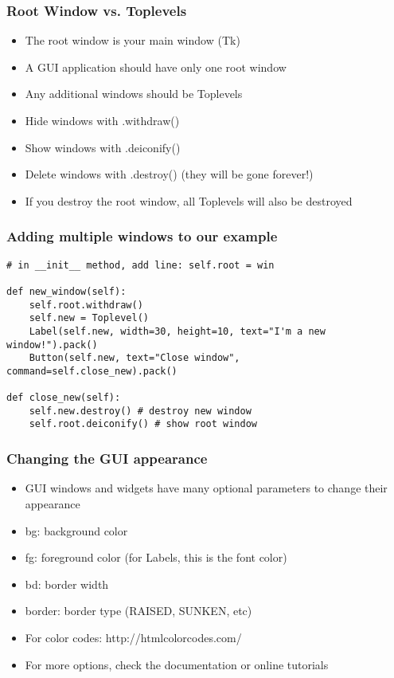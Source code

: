 \begin{frame}[fragile] \frametitle{Root Window vs. Toplevels}
\begin{itemize}
\item The root window is your main window (Tk)
\item A GUI application should have only one root window
\item Any additional windows should be Toplevels
\item Hide windows with .withdraw()
\item Show windows with .deiconify()
\item Delete windows with .destroy() (they will be gone forever!)
\item If you destroy the root window, all Toplevels will also be destroyed

\end{itemize}
\end{frame}

\begin{frame}[fragile] \frametitle{Adding multiple windows to our example}
\begin{lstlisting}
# in __init__ method, add line: self.root = win

def new_window(self):
	self.root.withdraw()
	self.new = Toplevel()
	Label(self.new, width=30, height=10, text="I'm a new window!").pack()
	Button(self.new, text="Close window", command=self.close_new).pack()

def close_new(self):
	self.new.destroy() # destroy new window
	self.root.deiconify() # show root window

\end{lstlisting}
\end{frame}


\begin{frame}[fragile] \frametitle{Changing the GUI appearance}
\begin{itemize}
\item GUI windows and widgets have many optional parameters to change their appearance
\item bg: background color
\item fg: foreground color (for Labels, this is the font color)
\item bd: border width
\item border: border type (RAISED, SUNKEN, etc)
\item For color codes: http://htmlcolorcodes.com/ 
\item For more options, check the documentation or online tutorials
\end{itemize}
\end{frame}






